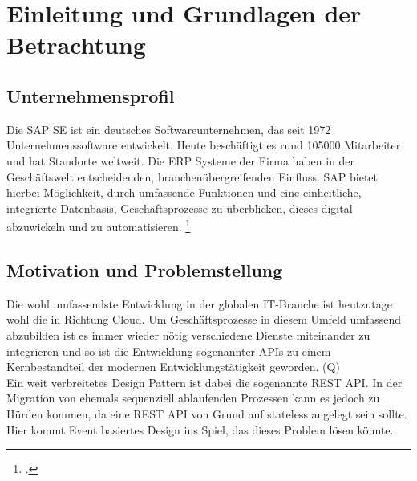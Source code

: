\section{Einleitung und Grundlagen der Betrachtung}

\subsection{Unternehmensprofil}
Die SAP SE ist ein deutsches Softwareunternehmen, das seit 1972 Unternehmenssoftware entwickelt. Heute beschäftigt es rund 105000 Mitarbeiter und hat Standorte weltweit. Die \ac{ERP} Systeme der Firma haben in der Geschäftswelt entscheidenden, branchenübergreifenden Einfluss. SAP bietet hierbei Möglichkeit, durch umfassende Funktionen und eine einheitliche, integrierte Datenbasis, Geschäftsprozesse zu überblicken, dieses digital abzuwickeln und zu automatisieren. \footcite[Vgl.][]{sapse_was}


\subsection{Motivation und Problemstellung}
Die wohl umfassendste Entwicklung in der globalen \ac{IT}-Branche ist heutzutage wohl die in Richtung Cloud. Um Geschäftsprozesse in diesem Umfeld umfassend abzubilden ist es immer wieder nötig verschiedene Dienste miteinander zu integrieren und so ist die Entwicklung sogenannter APIs zu einem Kernbestandteil der modernen Entwicklungstätigkeit geworden. (Q)
\\Ein weit verbreitetes Design Pattern ist dabei die sogenannte \ac{REST} \ac{API}. In der Migration von ehemals sequenziell ablaufenden Prozessen kann es jedoch zu Hürden kommen, da eine \ac{REST} \ac{API} von Grund auf stateless angelegt sein sollte. Hier kommt Event basiertes Design ins Spiel, das dieses Problem lösen könnte.

